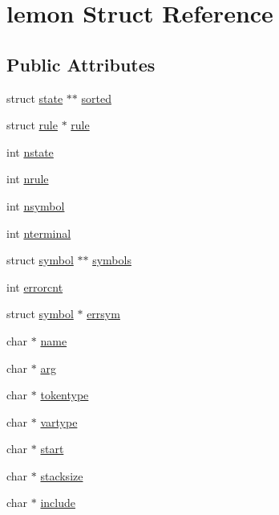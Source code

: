 \hypertarget{structlemon}{\section{lemon Struct Reference}
\label{structlemon}
}
\subsection*{Public Attributes}
\begin{DoxyCompactItemize}
\item 
struct \hyperlink{structstate}{state} $\ast$$\ast$ \hyperlink{structlemon_ac2948d15b5871689b5e81a53b2d9a784}{sorted}
\item 
struct \hyperlink{structrule}{rule} $\ast$ \hyperlink{structlemon_a2fa36e0fa6e3789057bbfaf2dd693a8e}{rule}
\item 
int \hyperlink{structlemon_a04dc7916df27637312d97cd0e56a2587}{nstate}
\item 
int \hyperlink{structlemon_ab2eb64aec57c0ec728204ccbac59ef1c}{nrule}
\item 
int \hyperlink{structlemon_ab4d4f29008ddd135a5b66e0b2d48c2bf}{nsymbol}
\item 
int \hyperlink{structlemon_acce4d604b00b21238262f51cf2d5c7cc}{nterminal}
\item 
struct \hyperlink{structsymbol}{symbol} $\ast$$\ast$ \hyperlink{structlemon_a48601b9fa6772db8f0450213ee09d511}{symbols}
\item 
int \hyperlink{structlemon_a3cf1bbc0784190e828d6e9aa97e0c387}{errorcnt}
\item 
struct \hyperlink{structsymbol}{symbol} $\ast$ \hyperlink{structlemon_abc9604a50182ad25f9adac62c9af6b1c}{errsym}
\item 
char $\ast$ \hyperlink{structlemon_a278763cc1efb250e51a339e6ece76779}{name}
\item 
char $\ast$ \hyperlink{structlemon_afbb9017cbf48aadc1fce940098f3fcab}{arg}
\item 
char $\ast$ \hyperlink{structlemon_a5a8197998a3b44a5aebfa1c3656284d7}{tokentype}
\item 
char $\ast$ \hyperlink{structlemon_aba6673e46aed4d62614c1042f70fde66}{vartype}
\item 
char $\ast$ \hyperlink{structlemon_ac94fcf0e746da894b198df228cf6d6e2}{start}
\item 
char $\ast$ \hyperlink{structlemon_aae5b11fade9ca3ca21fa6d3c1ed7545a}{stacksize}
\item 
char $\ast$ \hyperlink{structlemon_a28f30e75b7f399aa335adc47a32f46cb}{include}

\end{DoxyCompactItemize}
